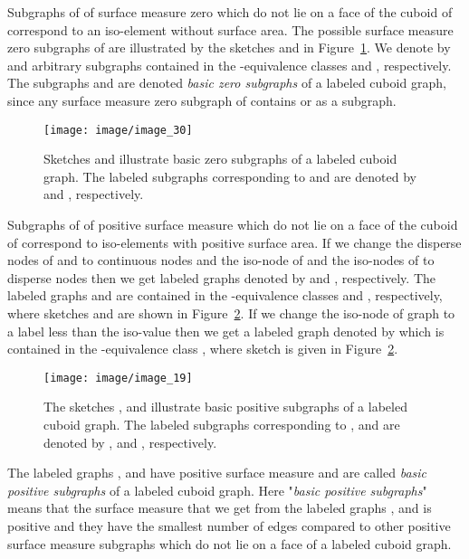 \documentclass[a4paper,11pt]{article}
\begin{document}
Subgraphs of  of surface measure zero which do not lie on a face of the cuboid of  correspond to an
iso-element without surface area. The possible surface measure zero subgraphs of 
are illustrated by the sketches  and  in Figure~\ref{image_30}. We denote by  and
 arbitrary subgraphs contained in the -equivalence classes  and
, respectively. The subgraphs  and  are denoted {\it basic
zero subgraphs} of a labeled cuboid graph, since any surface measure zero subgraph of  contains 
or  as a subgraph.
\begin{figure}[!ht]
\texttt{[image: image/image\_30]}
\caption{Sketches  and  illustrate basic zero subgraphs of a labeled cuboid graph. The
labeled subgraphs corresponding to  and  are denoted by  and ,
respectively.}
\label{image_30}
\end{figure}
\FloatBarrier
Subgraphs of  of positive surface measure which do not lie on a face of the cuboid of  correspond
to iso-elements with positive surface area. If we change the disperse nodes of  and
 to continuous nodes and the iso-node of  and the iso-nodes of  to disperse
nodes then we get labeled graphs denoted by  and , respectively. The labeled graphs  and 
are contained in the -equivalence classes  and , respectively,
where sketches  and  are shown in Figure~\ref{image_19}. If we change the iso-node of graph
 to a label less than the iso-value  then we get a labeled graph denoted by  which
is contained in the -equivalence class , where sketch  is given in
Figure~\ref{image_19}.
\begin{figure}[!ht]
\texttt{[image: image/image\_19]}
\caption{The sketches ,  and   illustrate basic positive subgraphs of a labeled cuboid graph.
The labeled subgraphs corresponding to ,  and   are denoted by ,  and ,
respectively.}
\label{image_19}
\end{figure}
\FloatBarrier
The labeled graphs ,  and  have positive surface measure and are called {\it basic positive subgraphs}
of a labeled cuboid graph. Here "{\it basic positive subgraphs}" means that the surface measure that we get
from the labeled graphs ,  and  is positive and they have the smallest number of edges compared to
other positive surface measure subgraphs which do not lie on a face of a labeled cuboid graph.
\end{document}
